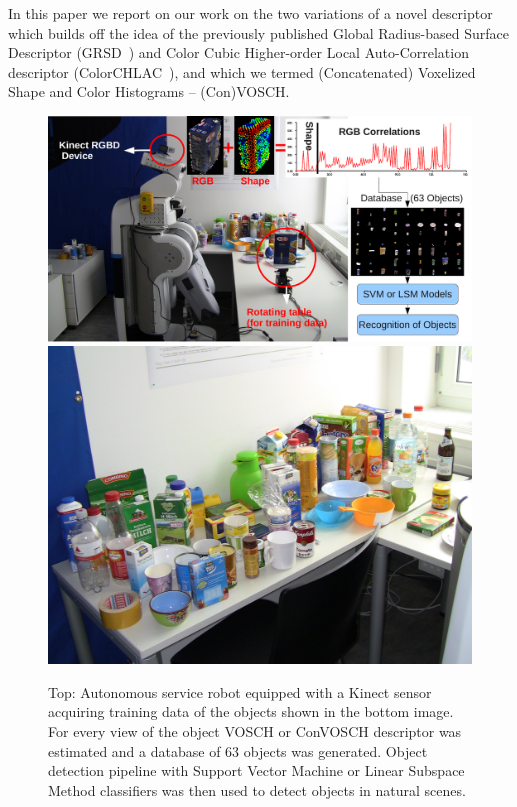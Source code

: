 \documentclass[conference]{sty/IEEEtran}
\begin{document}
In this paper we report on our work on the two variations of a novel descriptor
which builds off the idea of the previously 
published Global Radius-based Surface Descriptor (GRSD~\cite{GRSD10Humanoids}) and 
Color Cubic Higher-order Local Auto-Correlation descriptor (ColorCHLAC~\cite{kanezaki2010tvc}), 
and which we termed (Concatenated) Voxelized Shape and Color Histograms -- (Con)VOSCH.

\begin{figure}[htb!]
  \begin{center}
    \includegraphics[width=.99\columnwidth]{figures/firstpage/firstpage.pdf}
    \includegraphics[width=.99\columnwidth]{figures/objects/objects.jpg}
    \caption{Top: Autonomous service robot equipped with a Kinect sensor
    acquiring training data of the objects shown in the bottom image. For 
  every view of the object VOSCH or ConVOSCH descriptor was estimated and a database
of 63 objects was generated. Object detection pipeline with Support Vector
Machine or Linear Subspace Method classifiers was then used to detect objects
in natural scenes.}
    \label{fig:robot}
  \end{center}
\end{figure}
\end{document}
